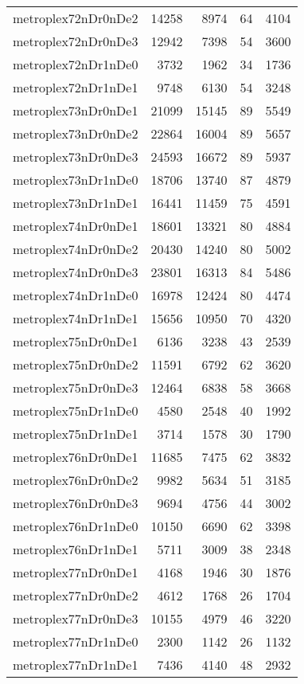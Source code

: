 \begin{longtable}{lrrrr}
metroplex72nDr0nDe2 & 14258 & 8974 & 64 & 4104 \\
metroplex72nDr0nDe3 & 12942 & 7398 & 54 & 3600 \\
metroplex72nDr1nDe0 & 3732 & 1962 & 34 & 1736 \\
metroplex72nDr1nDe1 & 9748 & 6130 & 54 & 3248 \\
metroplex73nDr0nDe1 & 21099 & 15145 & 89 & 5549 \\
metroplex73nDr0nDe2 & 22864 & 16004 & 89 & 5657 \\
metroplex73nDr0nDe3 & 24593 & 16672 & 89 & 5937 \\
metroplex73nDr1nDe0 & 18706 & 13740 & 87 & 4879 \\
metroplex73nDr1nDe1 & 16441 & 11459 & 75 & 4591 \\
metroplex74nDr0nDe1 & 18601 & 13321 & 80 & 4884 \\
metroplex74nDr0nDe2 & 20430 & 14240 & 80 & 5002 \\
metroplex74nDr0nDe3 & 23801 & 16313 & 84 & 5486 \\
metroplex74nDr1nDe0 & 16978 & 12424 & 80 & 4474 \\
metroplex74nDr1nDe1 & 15656 & 10950 & 70 & 4320 \\
metroplex75nDr0nDe1 & 6136 & 3238 & 43 & 2539 \\
metroplex75nDr0nDe2 & 11591 & 6792 & 62 & 3620 \\
metroplex75nDr0nDe3 & 12464 & 6838 & 58 & 3668 \\
metroplex75nDr1nDe0 & 4580 & 2548 & 40 & 1992 \\
metroplex75nDr1nDe1 & 3714 & 1578 & 30 & 1790 \\
metroplex76nDr0nDe1 & 11685 & 7475 & 62 & 3832 \\
metroplex76nDr0nDe2 & 9982 & 5634 & 51 & 3185 \\
metroplex76nDr0nDe3 & 9694 & 4756 & 44 & 3002 \\
metroplex76nDr1nDe0 & 10150 & 6690 & 62 & 3398 \\
metroplex76nDr1nDe1 & 5711 & 3009 & 38 & 2348 \\
metroplex77nDr0nDe1 & 4168 & 1946 & 30 & 1876 \\
metroplex77nDr0nDe2 & 4612 & 1768 & 26 & 1704 \\
metroplex77nDr0nDe3 & 10155 & 4979 & 46 & 3220 \\
metroplex77nDr1nDe0 & 2300 & 1142 & 26 & 1132 \\
metroplex77nDr1nDe1 & 7436 & 4140 & 48 & 2932 \\

\end{longtable}

